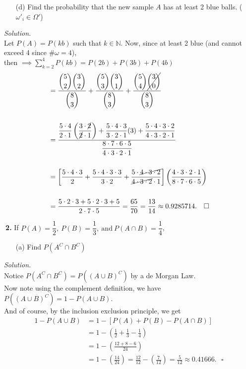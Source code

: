 \documentclass[12pt]{report}
\begin{document}
\begin{itemize}
\item [(d)]  Find the probability that the new sample $A$ has at least 2 blue balls. ($\omega'_i\in\Omega'$) 		%
\end{itemize}
\textit{Solution. } \\
Let $P(A)=P(kb)$ such that $k\in\mathbb{N}$.
Now, since at least 2 blue (and cannot exceed 4 since $\#\omega=4$),\\
then $\implies{}\displaystyle\sum\limits_{k=2}^{4}P(kb)=P(2b)+P(3b)+P(4b)$
\begin{align*}
&=\dfrac{\displaystyle{5\choose2}{3\choose2}}{\displaystyle{8\choose3}}+\dfrac{\displaystyle{5\choose3}{3\choose1}}{\displaystyle{8\choose3}}+\dfrac{\displaystyle{5\choose4}\cancel{{3\choose0}}}{\displaystyle{8\choose3}}\\\\
&=\dfrac{  \dfrac{5\cdot4}{2\cdot1}\left(\dfrac{3\cdot\cancel{2}}{\cancel{2}\cdot1}\right)  +  \dfrac{5\cdot4\cdot3}{3\cdot2\cdot1}(3)   +   \dfrac{5\cdot4\cdot3\cdot2}{4\cdot3\cdot2\cdot1}}        {\dfrac{8\cdot7\cdot6\cdot5}{4\cdot3\cdot2\cdot1}}\\\\
&=  \left[   \dfrac{5\cdot4\cdot3}{2}+\dfrac{5\cdot4\cdot3\cdot3}{3\cdot2} + \dfrac{5\cdot\cancel{4\cdot3\cdot2}}{\cancel{4\cdot3\cdot2}\cdot1}   \right]   \left(\dfrac{4\cdot3\cdot2\cdot1}{8\cdot7\cdot6\cdot5}\right)\\\\
&= \dfrac{5\cdot2\cdot3+5\cdot2\cdot3+5}{2\cdot7\cdot5}=\dfrac{65}{70}=\dfrac{13}{14}\approx0.9285714.~~~\square
\end{align*}


\pagebreak






\noindent {} $~$\textbf{2.} If $P(A)=\dfrac{1}{2},~P(B)=\dfrac{1}{3},~\text{and}~P(A\cap B)=\dfrac{1}{4}$,
\begin{itemize}
\item [(a)] Find $P(A^C\cap B^C)$		%
\end{itemize}
\textit{Solution. } \\
Notice $P(A^C\cap B^C)=P((A\cup B)^C)$ by a de Morgan Law.\\
Now note using the complement definition, we have\\
$P((A\cup B)^C)=1-P(A\cup B)$.\\
And of course, by the inclusion exclusion principle, we get
\begin{align*}
1-P(A\cup B)&=1-[P(A)+P(B)-P(A\cap B)]\\
&=1-\left(\frac{1}{2}+\frac{1}{3}-\frac{1}{4}\right)\\
&=1-\left(\frac{12+8-6}{24}\right)\\
&=1-\left(\frac{14}{24}\right)=\frac{12}{12}-\left(\frac{7}{12}\right)=\frac{5}{12}\approx0.41666.~~~\square
\end{align*}
\end{document}
